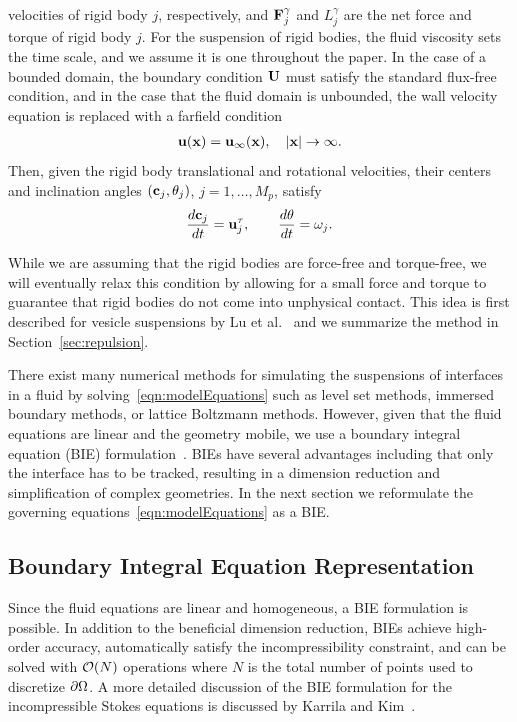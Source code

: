\documentclass[preprint, 10pt]{elsarticle}
\begin{document}
velocities of rigid body $j$, respectively, and ${\mathbf{F}}_j^\gamma$ and
$L_j^\gamma$ are the net force and torque of rigid body $j$.  For the
suspension of rigid bodies, the fluid viscosity sets the time scale, and
we assume it is one throughout the paper.  In the case of a bounded
domain, the boundary condition ${\mathbf{U}}$ must satisfy the standard flux-free
condition, and in the case that the fluid domain is unbounded, the wall
velocity equation is replaced with a farfield condition
\begin{align*}
  {\mathbf{u}}({\mathbf{x}}) = {\mathbf{u}}_\infty({\mathbf{x}}), \quad |{\mathbf{x}}| \rightarrow \infty.
\end{align*}
Then, given the rigid body translational and rotational velocities,
their centers and inclination angles $({\mathbf{c}}_j,\theta_j)$,
$j=1,\ldots,M_p$, satisfy
\begin{align}
\begin{split}
  \frac{d{\mathbf{c}}_j}{dt} = {\mathbf{u}}^\tau_j, \qquad 
  \frac{d\theta}{dt} = \omega_j.
\end{split}
\label{eqn:centersAngles}
\end{align}

While we are assuming that the rigid bodies are force-free and
torque-free, we will eventually relax this condition by allowing for a
small force and torque to guarantee that rigid bodies do not come into
unphysical contact.  This idea is first described for vesicle
suspensions by Lu et al.~\cite{Lu2017} and we summarize the method in
Section~\ref{sec:repulsion}.  

There exist many numerical methods for simulating the suspensions of
interfaces in a fluid by solving~\eqref{eqn:modelEquations} such as
level set methods, immersed boundary methods, or lattice Boltzmann
methods.  However, given that the fluid equations are linear and the
geometry mobile, we use a boundary integral equation (BIE)
formulation~\cite{Pozrikidis1992}.  BIEs have several advantages
including that only the interface has to be tracked, resulting in a
dimension reduction and simplification of complex geometries.  In the
next section we reformulate the governing
equations~\eqref{eqn:modelEquations} as a BIE.

\subsection{Boundary Integral Equation Representation}
Since the fluid equations are linear and homogeneous, a BIE formulation
is possible.  In addition to the beneficial dimension reduction, BIEs
achieve high-order accuracy, automatically satisfy the incompressibility
constraint, and can be solved with ${\mathcal{O}}(N)$ operations where $N$ is
the total number of points used to discretize ${\partial}\Omega$.  A more
detailed discussion of the BIE formulation for the incompressible Stokes
equations is discussed by Karrila and Kim~\cite{Karrila1989}.
\end{document}
